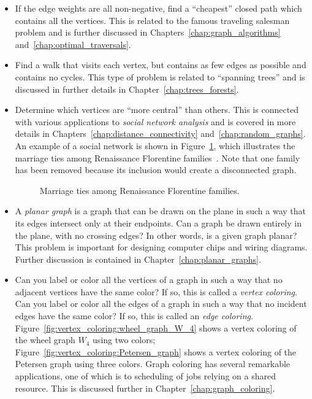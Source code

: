 \begin{itemize}
\item If the edge weights are all non-negative, find a ``cheapest''
  closed path which contains all the vertices. This is related to the
  famous traveling salesman problem and is further discussed in
  Chapters~\ref{chap:graph_algorithms} and~\ref{chap:optimal_traversals}.

\item Find a walk that visits each vertex, but contains as few edges
  as possible and contains no cycles. This type of problem is related
  to ``spanning trees'' and is discussed in further details in
  Chapter~\ref{chap:trees_forests}.

\item Determine which vertices are ``more central'' than others. This
  is connected with various applications to
  \emph{social network analysis} and is
  covered in more details in Chapters~\ref{chap:distance_connectivity}
  and~\ref{chap:random_graphs}. An example of a social network is shown
  in Figure~\ref{fig:introduction:marriage_ties_Renaissance}, which
  illustrates the marriage ties among Renaissance Florentine
  families~\cite{Borgatti2005}. Note that one family has been removed
  because its inclusion would create a disconnected graph.

\begin{figure}[!htbp]
\centering

\caption{Marriage ties among Renaissance Florentine families.}
\label{fig:introduction:marriage_ties_Renaissance}
\end{figure}

\item A \emph{planar graph} is a graph that can be drawn on the plane
  in such a way that its edges intersect only at their endpoints. Can
  a graph be drawn entirely in the plane, with no crossing edges? In
  other words, is a given graph planar? This problem is important for
  designing computer chips and wiring diagrams. Further discussion is
  contained in Chapter~\ref{chap:planar_graphs}.

\item Can you label or color all the vertices of a graph in such a
  way that no adjacent vertices have the same color? If so, this is
  called a \emph{vertex coloring}. Can you label or color all the
  edges of a graph in such a way that no incident edges have the same
  color? If so, this is called an \emph{edge coloring}.
  Figure~\ref{fig:vertex_coloring:wheel_graph_W_4} shows a vertex
  coloring of the wheel graph $W_4$ using two colors;
  Figure~\ref{fig:vertex_coloring:Petersen_graph} shows a vertex
  coloring of the Petersen graph using three colors. Graph coloring
  has several remarkable applications, one of which is to scheduling
  of jobs relying on a shared resource. This is discussed further in
  Chapter~\ref{chap:graph_coloring}.


\end{itemize}
